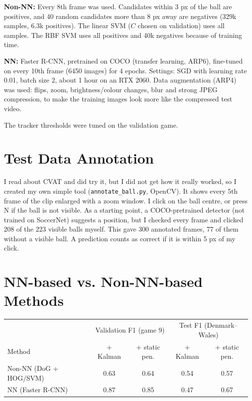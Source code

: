 \documentclass[12pt]{article}
\begin{document}
\textbf{Non-NN:} Every 8th frame was used. Candidates within 3 px of the ball are positives, and 40 random candidates more than 8 px away are negatives (329k samples, 6.3k positives). The linear SVM ($C$ chosen on validation) uses all samples. The RBF SVM uses all positives and 40k negatives because of training time.

\textbf{NN:} Faster R-CNN, pretrained on COCO (transfer learning, ARP6), fine-tuned on every 10th frame (6450 images) for 4 epochs. Settings: SGD with learning rate 0.01, batch size 2, about 1 hour on an RTX 2060. Data augmentation (ARP4) was used: flips, zoom, brightness/colour changes, blur and strong JPEG compression, to make the training images look more like the compressed test video.

The tracker thresholds were tuned on the validation game.

\section{Test Data Annotation}
I read about CVAT and did try it, but I did not get how it really worked, so I created my own simple tool (\texttt{annotate\_ball.py}, OpenCV). It shows every 5th frame of the clip enlarged with a zoom window. I click on the ball centre, or press N if the ball is not visible. As a starting point, a COCO-pretrained detector (not trained on SoccerNet) suggests a position, but I checked every frame and clicked 208 of the 223 visible balls myself. This gave 300 annotated frames, 77 of them without a visible ball. A prediction counts as correct if it is within 5 px of my click.

\section{NN-based vs. Non-NN-based Methods}
\begin{table}[h]
\centering
\begin{tabular}{lcccc}
\toprule
 & \multicolumn{2}{c}{Validation F1 (game 9)} & \multicolumn{2}{c}{Test F1 (Denmark--Wales)} \\
Method & + Kalman & + static pen. & + Kalman & + static pen. \\
\midrule
Non-NN (DoG + HOG/SVM) & 0.63 & 0.64 & 0.54 & 0.57 \\
NN (Faster R-CNN) & 0.87 & 0.85 & 0.47 & 0.67 \\
\bottomrule
\end{tabular}
\end{table}
\end{document}
